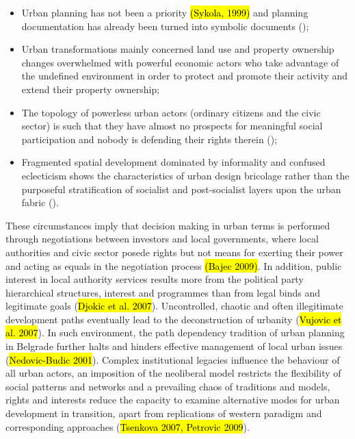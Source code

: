 \documentclass[11pt]{report}
\begin{document}
\begin{itemize}
\item Urban planning has not been a priority \hl{(Sykola, 1999)} and planning documentation has already been turned into symbolic documents (\cite{Nedovic-Budic 2001});

\item Urban transformations mainly concerned land use and property ownership changes overwhelmed with powerful economic actors who take advantage of the undefined environment in order to protect and promote their activity and extend their property ownership;
 
\item The topology of powerless urban actors (ordinary citizens and the civic sector) is such that they have almost no prospects for meaningful social participation and nobody is defending their rights therein (\cite{Vujovic et al. 2007});

\item Fragmented spatial development dominated by informality and confused eclecticism shows the characteristics of urban design bricolage rather than the purposeful stratification of socialist and post-socialist layers upon the urban fabric (\cite{Hirt 2008}). 
\end{itemize}

These circumstances imply that decision making in urban terms is performed through negotiations between investors and local governments, where local authorities and civic sector posede rights but not means for exerting their power and acting as equals in the negotiation process \hl{(Bajec 2009)}.
In addition, public interest in local authority services results more from the political party hierarchical structures, interest and programmes than from legal binds and legitimate goals (\hl{Djokic et al. 2007}).
Uncontrolled, chaotic and often illegitimate development paths eventually lead to the deconstruction of urbanity (\hl{Vujovic et al. 2007}).
In such environment, the path dependency tradition of urban planning in Belgrade further halts and hinders effective management of local urban issues (\hl{Nedovic-Budic 2001}).
Complex institutional legacies influence the behaviour of all urban actors, an imposition of the neoliberal model restricts the flexibility of social patterns and networks and a prevailing chaos of traditions and models, rights and interests reduce the capacity to examine alternative modes for urban development in transition, apart from replications of western paradigm and corresponding approaches 
(\hl{Tsenkova 2007, Petrovic 2009}).
   
\end{document}
